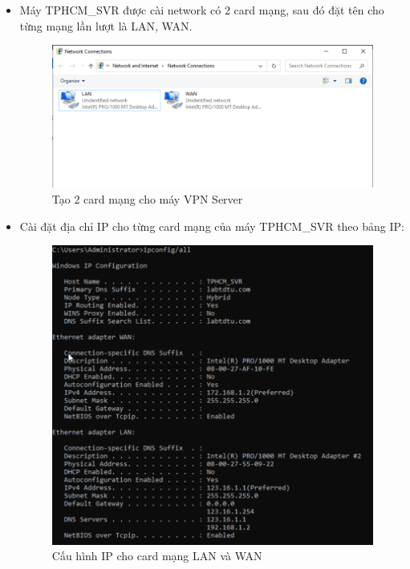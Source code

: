    \begin{itemize}
      \item Máy TPHCM\_SVR được cài network có 2 card mạng, sau đó đặt tên cho từng mạng lần lượt là LAN, WAN.
       \begin{figure}[htbp]
        \centering
        \includegraphics[width=0.5\linewidth]{SiteToSiteImg/cardNetwork.png}
        \caption{Tạo 2 card mạng cho máy VPN Server}
        \end{figure}
      \item Cài đặt địa chỉ IP cho từng card mạng của máy TPHCM\_SVR theo bảng IP:
      
        \begin{figure}[htbp]
        \centering
        \includegraphics[width=0.5\linewidth]{SiteToSiteImg/ipHCM.png}
        \caption{Cấu hình IP cho card mạng LAN và WAN}
        \end{figure}
        

\end{itemize}
